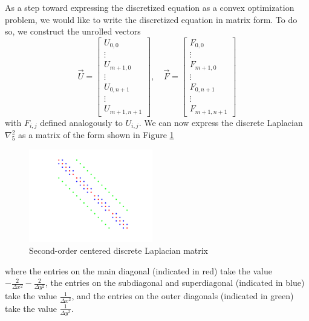 \documentclass[conference]{IEEEtran}
\begin{document}
As a step toward expressing the discretized equation as a convex optimization problem, we would like to write the discretized equation in matrix form. To do so, we construct the unrolled vectors
\begin{equation}
  \vec{U} = \begin{bmatrix}
    U_{0,0} \\ \vdots \\ U_{m+1,0} \\ \vdots \\ U_{0,n+1} \\ \vdots \\ U_{m+1,n+1}
  \end{bmatrix}, \quad \vec{F} = \begin{bmatrix}
    F_{0,0} \\ \vdots \\ F_{m+1,0} \\ \vdots \\ F_{0,n+1} \\ \vdots \\ F_{m+1,n+1}
  \end{bmatrix}
\end{equation}
with $F_{i,j}$ defined analogously to $U_{i,j}$. We can now express the discrete Laplacian $\nabla_5^2$ as a matrix of the form shown in Figure \ref{fig:discrete-laplacian}
\begin{figure}[t]
  \begin{center}
    \includegraphics[width=0.48\textwidth]{figures/discrete-laplacian}
    \caption{Second-order centered discrete Laplacian matrix}
    \label{fig:discrete-laplacian}
  \end{center}
\end{figure}
where the entries on the main diagonal (indicated in red) take the value $-\frac{2}{\Delta x^2}-\frac{2}{\Delta y^2}$, the entries on the subdiagonal and superdiagonal (indicated in blue) take the value $\frac{1}{\Delta x^2}$, and the entries on the outer diagonals (indicated in green) take the value $\frac{1}{\Delta y^2}$.
\end{document}
